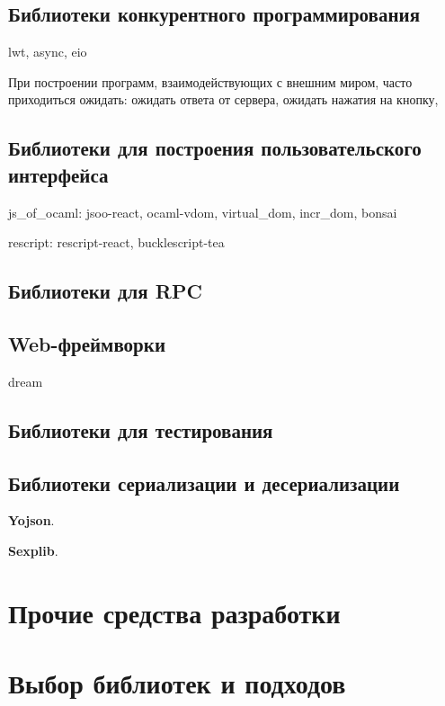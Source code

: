 \TODO

\subsection{Библиотеки конкурентного программирования}

lwt, async, eio \TODO

При построении программ, взаимодействующих с внешним миром,
часто приходиться ожидать: 
ожидать ответа от сервера, 
ожидать нажатия на кнопку, 

\subsection{Библиотеки для построения пользовательского интерфейса}

\TODO

js\_of\_ocaml: jsoo-react, ocaml-vdom, virtual\_dom, incr\_dom, bonsai

rescript: rescript-react, bucklescript-tea

\subsection{Библиотеки для RPC}

\TODO

\subsection{Web-фреймворки}

dream  \TODO

\subsection{Библиотеки для тестирования}

\TODO

\subsection{Библиотеки сериализации и десериализации}

\TODO

\textbf{Yojson}.

\textbf{Sexplib}.

\section{Прочие средства разработки}



\section{Выбор библиотек и подходов}

\TODO
